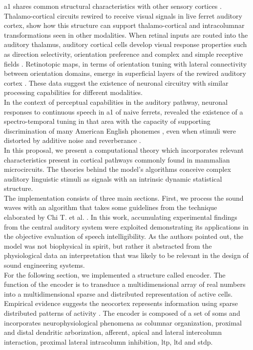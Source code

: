 \documentclass[11pt,a4paper]{article}
\begin{document}
\gls{a1} shares common structural
characteristics with other sensory cortices
\cite{huang_2000, winer_1992, rockel_1980, mitani_1985, mitani_1985A}.
Thalamo-cortical circuits rewired to receive
visual signals in live ferret auditory cortex,
show how this structure can support
thalamo-cortical and intracolumnar transformations
seen in other modalities.
When retinal inputs are routed into the auditory thalamus,
auditory cortical cells develop visual response properties
such as direction selectivity,
orientation preference and
complex and simple receptive fields
\cite{sur_1988, angelucci_1998, roe_1992}.
Retinotopic maps, in terms of orientation tuning with lateral connectivity between
orientation domains, emerge in superficial layers of the rewired
auditory cortex \cite{roe_1990, sur_2000}.
These data suggest the existence of neuronal circuitry
with similar processing capabilities for different modalities.\\

In the context of perceptual capabilities in 
the auditory pathway,
neuronal responses to continuous speech in
\gls{a1} of naive ferrets,
revealed the existence of a spectro-temporal tuning
in that area with the capacity of supporting discrimination
of many American English phonemes \cite{mesgarani_2008},
even when stimuli were distorted by additive noise and
reverberance \cite{mesgarani_2014A}.\\

In this proposal, we present a computational
theory which incorporates relevant
characteristics present in cortical pathways commonly found in mammalian
microcircuits. The theories behind the model’s algorithms conceive complex
auditory linguistic stimuli as signals with an intrinsic dynamic statistical
structure. \\

The implementation consists of three main sections.
First, we process the sound waves with an algorithm
that takes some guidelines from
the technique elaborated by Chi T. et al. \cite{chi_2005}.
In this work, accumulating experimental findings
from the central auditory system
were exploited demonstrating its applications in the objective
evaluation of speech intelligibility.
As the authors pointed out, the model was not biophysical in spirit,
but rather it abstracted from the physiological data an interpretation
that was likely to be relevant in the design of sound engineering systems. \\

For the following section, we implemented a structure called encoder.
The function of the encoder is to transduce a multidimensional
array of real numbers into a multidimensional sparse and distributed representation of
active cells. Empirical evidence suggests the neocortex represents 
information using sparse distributed patterns of activity \cite{barth_2012}.
The encoder is composed of a set of \glspl{som} \cite{kohonen_2082, Kohonen:1989:SAM:69371}
and incorporates neurophysiological phenomena as columnar organization, proximal and distal
dendritic arborization, afferent, apical and lateral intercolumn interaction, proximal
lateral intracolumn inhibition, \gls{ltp}, \gls{ltd} and \gls{stdp}. \\
\end{document}
